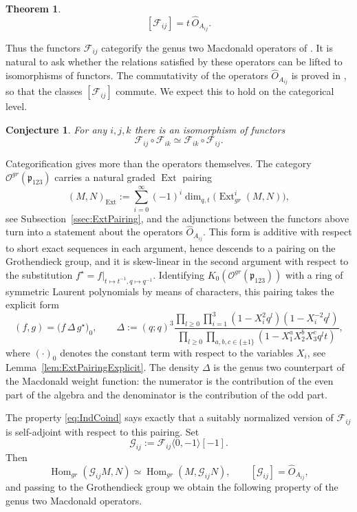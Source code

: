 \documentclass[10pt]{amsart}
\newcommand{\sh}[2]{\langle #1,#2\rangle}
\newtheorem{conjecture}[theorem]{Conjecture}
\newtheorem{theoremB}{Theorem}
\newcommand{\fp}{{\mathfrak p}}
\DeclareMathOperator{\Hom}{Hom}
\DeclareMathOperator{\Ext}{Ext}
\begin{document}
	\begin{theoremB}
		\[[\mathcal{F}_{ij}]=t\, \hat O_{A_{ij}}.\]
	\end{theoremB}
	
	Thus the functors $\mathcal{F}_{ij}$ categorify the genus two Macdonald operators of \cite{ArthamonovShakirov-2019}. It is natural to ask whether the relations satisfied by these operators can be lifted to isomorphisms of functors. The commutativity of the operators $\hat O_{A_{ij}}$ is proved in \cite{ArthamonovShakirov-2019}, so that the classes $[\mathcal{F}_{ij}]$ commute. We expect this to hold on the categorical level.
	
	\begin{conjecture}
		For any $i,j,k$ there is an isomorphism of functors
		\[\mathcal{F}_{ij}\circ\mathcal{F}_{ik}\simeq \mathcal{F}_{ik}\circ \mathcal{F}_{ij}.\]
	\end{conjecture}
	
	Categorification gives more than the operators themselves. The category
	$\mathcal{O}^{gr}(\fp_{123})$ carries a natural graded $\Ext$ pairing
	\[(M,N)_{\Ext}:=\sum_{i=0}^{\infty}(-1)^i\dim_{q,t}\bigl(\Ext^{i}_{gr}(M ,N)\bigr),\]
	see Subsection~\ref{ssec:ExtPairing}, and the adjunctions between the functors above turn into a statement about the operators $\hat O_{A_{ij}}$. This form is additive with respect to short exact sequences in each argument, hence descends to a pairing on the Grothendieck group, and it is skew-linear in the second argument with respect to the substitution $f^\star=f|_{t\mapsto t^{-1},q\mapsto q^{-1}}$. Identifying $K_0(\mathcal{O}^{gr}(\fp_{123}))$ with a ring of symmetric Laurent polynomials by means of characters, this pairing takes the explicit form
	\[(f,g)=\bigl(f\,\Delta\, g^\star\bigr)_0,\qquad \Delta:=(q;q)^3\frac{\prod_{l \geq 0}\prod_{i=1}^3(1-X_i^2 q^l)(1-X_i^{-2} q^l)}{\prod_{l \geq 0}\prod_{a,b,c\in\{\pm 1\}}(1-X_1^aX_2^bX_3^c q^lt)},\]
	where $(\cdot)_0$ denotes the constant term with respect to the variables $X_i$, see Lemma~\ref{lem:ExtPairingExplicit}. The density $\Delta$ is the genus two counterpart of the Macdonald weight function: the numerator is the contribution of the even part of the algebra and the denominator is the contribution of the odd part.
	
	The property \eqref{eq:IndCoind} says exactly that a suitably normalized version of $\mathcal{F}_{ij}$ is self-adjoint with respect to this pairing. Set
	\[\mathcal{G}_{ij}:=\mathcal{F}_{ij}\sh{0}{-1}[-1].\]
	Then
	\[\Hom_{gr}(\mathcal{G}_{ij}M,N)\simeq \Hom_{gr}(M,\mathcal{G}_{ij}N),\qquad [\mathcal{G}_{ij}]=\hat O_{A_{ij}},\]
	and passing to the Grothendieck group we obtain the following property of the genus two Macdonald operators.
	
\end{document}
